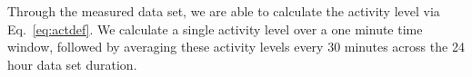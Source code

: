 Through the measured data set, we are able to calculate the activity level via Eq.~\ref{eq:actdef}.
We calculate a single activity level over a one minute time window, followed by averaging these activity levels every 30 minutes across the 24 hour data set duration.

\begin{table}
\centering %
\begin{tabular}{|l|c|c|c|c|c|c|c|c|c|c|c|c|c|} %
\hline %

\end{tabular}
\end{table}
